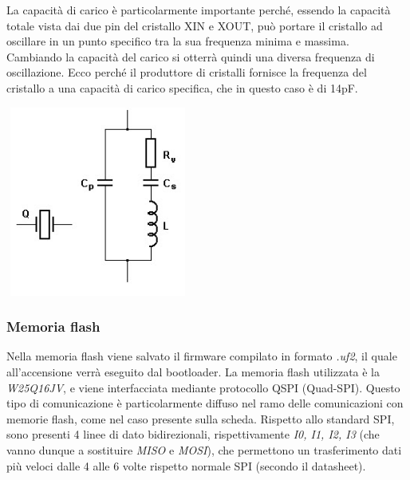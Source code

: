 La capacità di carico è particolarmente importante perché, essendo la
capacità totale vista dai due pin del cristallo XIN e XOUT, può portare
il cristallo ad oscillare in un punto specifico tra la sua frequenza
minima e massima. Cambiando la capacità del carico si otterrà quindi una
diversa frequenza di oscillazione. Ecco perché il produttore di
cristalli fornisce la frequenza del cristallo a una capacità di carico
specifica, che in questo caso è di 14pF.

\begin{center}
\includegraphics[width=2.38542in,height=2.45833in]{figures/image28.png}
\captionsetup{type=figure}
\end{center}

\hypertarget{memoria-flash}{%
\subsubsection{\texorpdfstring{\hfill\break
Memoria flash}{ Memoria flash}}\label{memoria-flash}}

Nella memoria flash viene salvato il firmware compilato in formato
\emph{.uf2}, il quale all'accensione verrà eseguito dal bootloader. La
memoria flash utilizzata è la \emph{W25Q16JV}, e viene interfacciata
mediante protocollo QSPI (Quad-SPI). Questo tipo di comunicazione è
particolarmente diffuso nel ramo delle comunicazioni con memorie flash,
come nel caso presente sulla scheda. Rispetto allo standard SPI, sono
presenti 4 linee di dato bidirezionali, rispettivamente \emph{I0, I1,
I2, I3} (che vanno dunque a sostituire \emph{MISO} e \emph{MOSI}), che
permettono un trasferimento dati più veloci dalle 4 alle 6 volte
rispetto normale SPI (secondo il datasheet).

